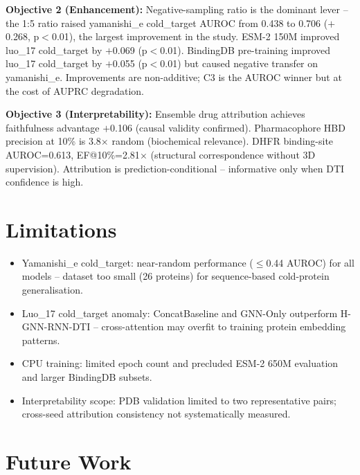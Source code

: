 \documentclass[12pt,a4paper,oneside]{report}
\begin{document}
\textbf{Objective 2 (Enhancement):} Negative-sampling ratio is the dominant lever -- the 1:5 ratio raised yamanishi\_e cold\_target AUROC from 0.438 to 0.706 ($+$0.268, p${<}$0.01), the largest improvement in the study. ESM-2 150M improved luo\_17 cold\_target by $+$0.069 (p${<}$0.01). BindingDB pre-training improved luo\_17 cold\_target by $+$0.055 (p${<}$0.01) but caused negative transfer on yamanishi\_e. Improvements are non-additive; C3 is the AUROC winner but at the cost of AUPRC degradation.

\textbf{Objective 3 (Interpretability):} Ensemble drug attribution achieves faithfulness advantage $+$0.106 (causal validity confirmed). Pharmacophore HBD precision at 10\% is 3.8$\times$ random (biochemical relevance). DHFR binding-site AUROC=0.613, EF@10\%=2.81$\times$ (structural correspondence without 3D supervision). Attribution is prediction-conditional -- informative only when DTI confidence is high.

\section{Limitations}

\begin{itemize}
  \item Yamanishi\_e cold\_target: near-random performance ($\leq$0.44 AUROC) for all models -- dataset too small (26 proteins) for sequence-based cold-protein generalisation.
  \item Luo\_17 cold\_target anomaly: ConcatBaseline and GNN-Only outperform H-GNN-RNN-DTI -- cross-attention may overfit to training protein embedding patterns.
  \item CPU training: limited epoch count and precluded ESM-2 650M evaluation and larger BindingDB subsets.
  \item Interpretability scope: PDB validation limited to two representative pairs; cross-seed attribution consistency not systematically measured.
\end{itemize}

\section{Future Work}
\end{document}

